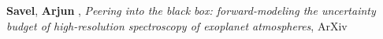 \item[{\color{numcolor}\scriptsize1}] \textbf{Savel}, \textbf{Arjun} , \emph{Peering into the black box: forward-modeling the uncertainty budget of high-resolution spectroscopy of exoplanet atmospheres}, ArXiv